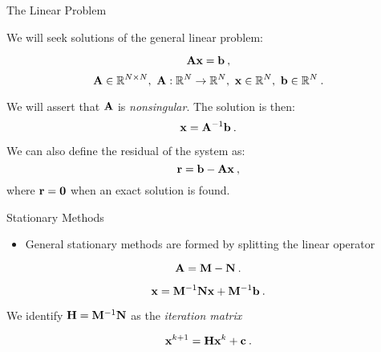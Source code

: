 \documentclass{beamer}
\begin{document}
\begin{frame}{The Linear Problem}

  We will seek solutions of the general linear problem:

  \[
  \mathbf{A} \mathbf{x} = \mathbf{b}\:,
  \]
  \[
  \mathbf{A} \in \mathbb{R}^{N \times N},\ \mathbf{A} : \mathbb{R}^{N}
  \rightarrow \mathbb{R}^{N},\ \mathbf{x} \in \mathbb{R}^N,\ \mathbf{b} \in
  \mathbb{R}^N\:.
  \]

  We will assert that $\mathbf{A}$ is \textit{nonsingular}. The solution
  is then:
  \[
  \mathbf{x} = \mathbf{A}^{-1}\mathbf{b}\:.
  \]

  We can also define the residual of the system as:
  \[
  \mathbf{r} = \mathbf{b} - \mathbf{A}\mathbf{x}\:,
  \]
  where $\mathbf{r}=\mathbf{0}$ when an exact solution is found.

\end{frame}

\begin{frame}{Stationary Methods}

  \begin{itemize}
  \item General stationary methods are formed by splitting the linear
    operator
  \end{itemize}

  \[
  \mathbf{A} = \mathbf{M} - \mathbf{N}\:.
  \]

  \[
  \mathbf{x} = \mathbf{M}^{-1}\mathbf{N}\mathbf{x} + \mathbf{M}^{-1}\mathbf{b}\:.
  \]

  We identify $\mathbf{H} =\mathbf{M}^{-1}\mathbf{N}$ as the \textit{iteration
    matrix}

  \[
  \mathbf{x}^{k+1} = \mathbf{H}\mathbf{x}^{k} + \mathbf{c}\:.
  \]

\end{frame}
\end{document}
